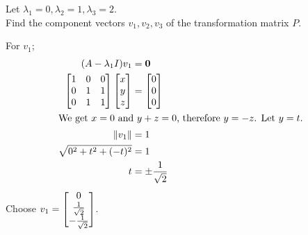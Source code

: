 \documentclass[12pt,final]{novelette} %
\begin{document}
\begin{question}
\begin{question}
        Let $\lambda_1 = 0, \lambda_2 = 1, \lambda_3 = 2$. \\
        Find the component vectors $v_1, v_2, v_3$ of the transformation matrix $P$.

        \medskip
        For $v_1$;
        \begin{align*}
            (A - \lambda_1 I) v_1     & = \mathbf{0}         \\
            \begin{bmatrix}
                1 & 0 & 0 \\
                0 & 1 & 1 \\
                0 & 1 & 1 \\
            \end{bmatrix}
            \begin{bmatrix}
                x \\ y \\ z
            \end{bmatrix}
                                      & = \begin{bmatrix}
                                              0 \\ 0 \\ 0
                                          \end{bmatrix}     \\
            \intertext{We get $x = 0$ and $y + z = 0$, therefore $y = -z$. Let $y = t$.}
            \lVert v_1 \rVert         & = 1                  \\
            \sqrt{0^2 + t^2 + (-t)^2} & = 1                  \\
            t                         & = \pm \frac1{\sqrt2}
        \end{align*}
        Choose $v_1 = \mqty[0 \\ \frac1{\sqrt2} \\ -\frac1{\sqrt2}]$.


\end{question}
\end{question}
\end{document}
